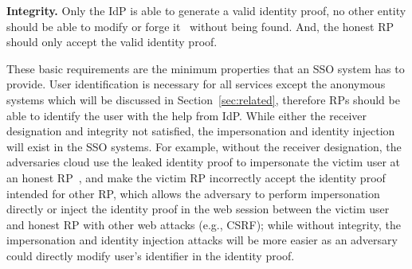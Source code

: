 \vspace{1mm}\noindent\textbf{Integrity.} Only the IdP is able to generate a valid identity proof,
     no other entity should be able to modify or forge it~\cite{WangZLG16} without being found. And, the honest RP should only accept the valid identity proof.

These basic requirements are the minimum properties that an SSO system has to provide.
User identification is necessary for all services except the anonymous systems which will be discussed in Section~\ref{sec:related},
 therefore RPs should be able to identify the user with the help from IdP.
While either the receiver designation and integrity not satisfied, the impersonation and identity injection will exist in the SSO systems.
For example, without the receiver designation,  the adversaries cloud use the leaked identity proof to impersonate the victim user at an honest RP~\cite{ChenPCTKT14,FettKS16,WangZLG16}, and  make the victim RP  incorrectly accept the identity proof intended for other RP, which allows the adversary to perform impersonation directly or inject the identity proof in the web session between the victim user and honest RP with other web attacks (e.g., CSRF);
while without integrity, the impersonation and identity injection attacks will be more easier as an adversary could directly modify user's identifier in the identity proof. %

